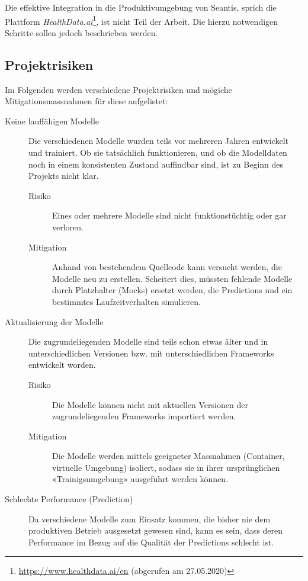 Die effektive Integration in die Produktivumgebung von Seantis, sprich die Plattform \textit{HealthData.ai}\footnote{\url{https://www.healthdata.ai/en} (abgerufen am 27.05.2020)}, ist nicht Teil der Arbeit. Die hierzu notwendigen Schritte sollen jedoch beschrieben werden.

\subsection{Projektrisiken}
\label{sec:projektrisiken}

Im Folgenden werden verschiedene Projektrisiken und mögiche Mitigationsmassnahmen für diese aufgelistet:

\begin{description}
    \item[Keine lauffähigen Modelle] Die verschiedenen Modelle wurden teils vor mehreren Jahren entwickelt und trainiert. Ob sie tatsächlich funktionieren, und ob die Modelldaten noch in einem konsistenten Zustand auffindbar sind, ist zu Beginn des Projekts nicht klar.
        \begin{description}
            \item[Risiko] Eines oder mehrere Modelle sind nicht funktionstüchtig oder gar verloren.
            \item[Mitigation] Anhand von bestehendem Quellcode kann versucht werden, die Modelle neu zu erstellen. Scheitert dies, müssten fehlende Modelle durch Platzhalter (Mocks) ersetzt werden, die Predictions und ein bestimmtes Laufzeitverhalten simulieren.
        \end{description}
    \item[Aktualisierung der Modelle] Die zugrundeliegenden Modelle sind teils schon etwas älter und in unterschiedlichen Versionen bzw. mit unterschiedlichen Frameworks entwickelt worden.
        \begin{description}
            \item[Risiko] Die Modelle können nicht mit aktuellen Versionen der zugrundeliegenden Frameworks importiert werden.
            \item[Mitigation] Die Modelle werden mittels geeigneter Massnahmen (Container, virtuelle Umgebung) isoliert, sodass sie in ihrer ursprünglichen «Trainigsumgebung» ausgeführt werden können.
        \end{description}
    \item[Schlechte Performance (Prediction)] Da verschiedene Modelle zum Einsatz kommen, die bisher nie dem produktiven Betrieb ausgesetzt gewesen sind, kann es sein, dass deren Performance im Bezug auf die Qualität der Predictions schlecht ist.

\end{description}
